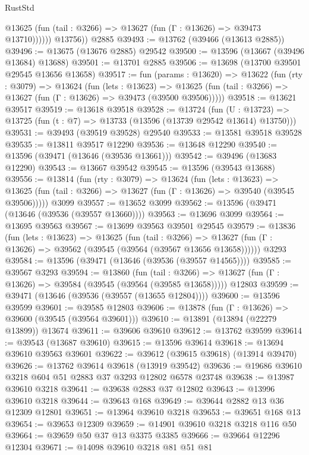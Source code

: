 \begin{lexlean}{RustStd}
\begin{coremodule}
              @13625 (fun (tail : @3266) => @13627 (fun (Γ : @13626) => @39473 @13710))))))
        @13756))
    @2885
@39493 := @13762 (@39466 (@13613 @2885))
@39496 := @13675 (@13676 @2885) @29542
@39500 := @13596 (@13667 (@39496 @13684) @13688)
@39501 := @13701 @2885
@39506 := @13698 (@13700 @39501 @29545 @13656 @13658)
@39517 := fun (params : @13620) =>
  @13622
    (fun (rty : @3079) =>
    @13624
      (fun (lets : @13623) =>
      @13625 (fun (tail : @3266) => @13627 (fun (Γ : @13626) => @39473 (@39500 @39506)))))
@39518 := @13621 @39517
@39519 := @13618 @39518
@39528 := @13724
    (fun (U : @13723) => @13725 (fun (t : @7) => @13733 (@13596 (@13739 @29542 @13614) @13750)))
@39531 := @39493 (@39519 @39528) @29540
@39533 := @13581 @39518 @39528
@39535 := @13811 @39517 @12290
@39536 := @13648 @12290
@39540 := @13596 (@39471 (@13646 (@39536 @13661)))
@39542 := @39496 (@13683 @12290)
@39543 := @13667 @39542
@39545 := @13596 (@39543 @13688)
@39556 := @13814
    (fun (rty : @3079) =>
    @13624
      (fun (lets : @13623) =>
      @13625 (fun (tail : @3266) => @13627 (fun (Γ : @13626) => @39540 (@39545 @39506)))))
    @3099
@39557 := @13652 @3099
@39562 := @13596 (@39471 (@13646 (@39536 (@39557 @13660))))
@39563 := @13696 @3099
@39564 := @13695 @39563
@39567 := @13699 @39563 @39501 @29545
@39579 := @13836
    (fun (lets : @13623) =>
    @13625
      (fun (tail : @3266) =>
      @13627 (fun (Γ : @13626) => @39562 (@39545 (@39564 (@39567 @13656 @13658))))))
    @3293
@39584 := @13596 (@39471 (@13646 (@39536 (@39557 @14565))))
@39585 := @39567 @3293
@39594 := @13860
    (fun (tail : @3266) => @13627 (fun (Γ : @13626) => @39584 (@39545 (@39564 (@39585 @13658)))))
    @12803
@39599 := @39471 (@13646 (@39536 (@39557 (@13655 @12804))))
@39600 := @13596 @39599
@39601 := @39585 @12803
@39606 := @13878 (fun (Γ : @13626) => @39600 (@39545 (@39564 @39601)))
@39610 := @13891 (@13894 (@22279 @13899)) @13674
@39611 := @39606 @39610
@39612 := @13762 @39599
@39614 := @39543 (@13687 @39610)
@39615 := @13596 @39614
@39618 := @13694 @39610 @39563 @39601
@39622 := @39612 (@39615 @39618) (@13914 @39470)
@39626 := @13762 @39614 @39618 (@13919 @39542)
@39636 := @19686 @39610 @3218 @604 @51 @2883 @37 @3293 @12802 @6578 @23748
@39638 := @13987 @39610 @3218
@39641 := @39638 @2883 @37 @12802
@39643 := @13996 @39610 @3218
@39644 := @39643 @168
@39649 := @39644 @2882 @13 @36 @12309 @12801
@39651 := @13964 @39610 @3218
@39653 := @39651 @168 @13
@39654 := @39653 @12309
@39659 := @14901 @39610 @3218 @3218 @116 @50
@39664 := @39659 @50 @37 @13 @3375 @3385
@39666 := @39664 @12296 @12304
@39671 := @14098 @39610 @3218 @81 @51 @81

\end{coremodule}
\end{lexlean}
